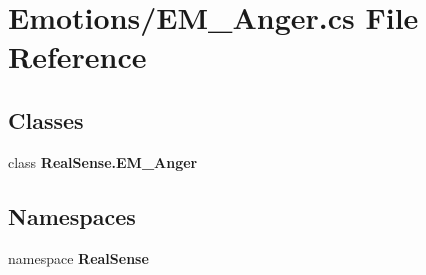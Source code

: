 \section{Emotions/\+E\+M\+\_\+\+Anger.cs File Reference}
\label{_e_m___anger_8cs}
\subsection*{Classes}
\begin{DoxyCompactItemize}
\item 
class \textbf{ Real\+Sense.\+E\+M\+\_\+\+Anger}
\end{DoxyCompactItemize}
\subsection*{Namespaces}
\begin{DoxyCompactItemize}
\item 
namespace \textbf{ Real\+Sense}
\end{DoxyCompactItemize}

